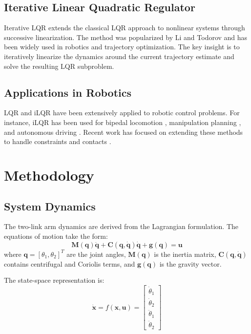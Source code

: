 \documentclass[conference]{IEEEtran}
\begin{document}
\subsection{Iterative Linear Quadratic Regulator}

Iterative LQR extends the classical LQR approach to nonlinear systems through successive linearization. The method was popularized by Li and Todorov \cite{li2004iterative} and has been widely used in robotics and trajectory optimization. The key insight is to iteratively linearize the dynamics around the current trajectory estimate and solve the resulting LQR subproblem.

\subsection{Applications in Robotics}

LQR and iLQR have been extensively applied to robotic control problems. For instance, iLQR has been used for bipedal locomotion \cite{tedrake2015efficient}, manipulation planning \cite{mason2018reusable}, and autonomous driving \cite{williams2017model}. Recent work has focused on extending these methods to handle constraints and contacts \cite{howell2022do}.

\section{Methodology}

\subsection{System Dynamics}

The two-link arm dynamics are derived from the Lagrangian formulation. The equations of motion take the form:
\begin{equation}
\mathbf{M}(\mathbf{q})\ddot{\mathbf{q}} + \mathbf{C}(\mathbf{q},\dot{\mathbf{q}})\dot{\mathbf{q}} + \mathbf{g}(\mathbf{q}) = \mathbf{u}
\end{equation}
where $\mathbf{q} = [\theta_1, \theta_2]^T$ are the joint angles, $\mathbf{M}(\mathbf{q})$ is the inertia matrix, $\mathbf{C}(\mathbf{q},\dot{\mathbf{q}})$ contains centrifugal and Coriolis terms, and $\mathbf{g}(\mathbf{q})$ is the gravity vector.

The state-space representation is:
\begin{equation}
\dot{\mathbf{x}} = f(\mathbf{x}, \mathbf{u}) = \begin{bmatrix} \dot{\theta}_1 \\ \dot{\theta}_2 \\ \ddot{\theta}_1 \\ \ddot{\theta}_2 \end{bmatrix}
\end{equation}
\end{document}
